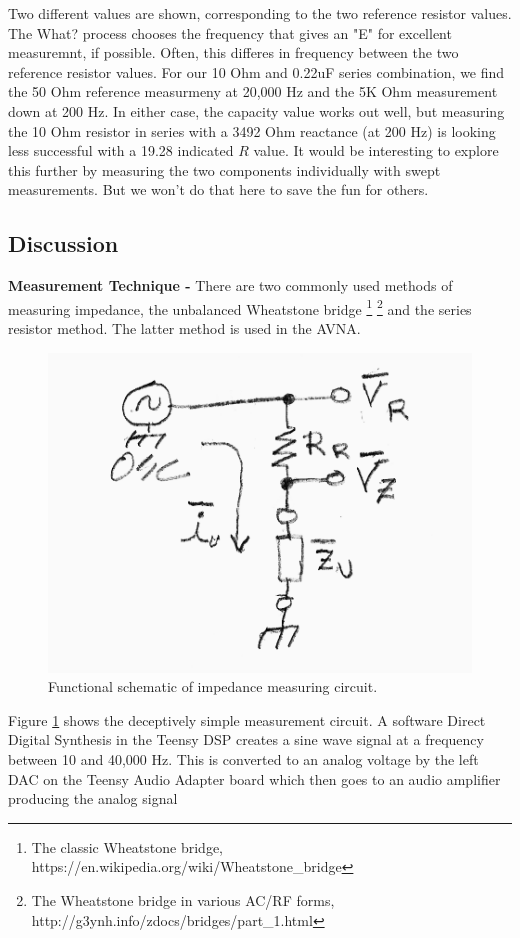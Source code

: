 %
Two different values are shown, corresponding to the two reference resistor values.  The What? process chooses the frequency that gives an "E" for excellent measuremnt, if possible.  Often, this differes in frequency between the two reference resistor values.  For our 10 Ohm and 0.22uF series combination, we find the 50 Ohm reference measurmeny at 20,000 Hz and the 5K Ohm measurement down at 200 Hz.  In either case, the capacity value works out well, but measuring the 10 Ohm resistor in series with a 3492 Ohm reactance (at 200 Hz) is looking less successful with a 19.28 indicated \(R\) value.  It would be interesting to explore this further by measuring the two components individually with swept measurements.  But we won't do that here to save the fun for others.
%
\subsection{Discussion}
%
\textbf{Measurement Technique - } There are two commonly used methods of measuring impedance, the unbalanced Wheatstone bridge
%
\footnote{The classic Wheatstone bridge, https://en.wikipedia.org/wiki/Wheatstone\_bridge}
\footnote{The Wheatstone bridge in various AC/RF forms, http://g3ynh.info/zdocs/bridges/part\_1.html}
% 
 and the series resistor method.   The latter method is used in the AVNA.
\begin{figure}[H]
\begin{center}
\includegraphics[scale=0.75]{./images/AVNA_900.pdf}
\caption{Functional schematic of impedance measuring circuit.}
\label{AVNA_900-label}
\end{center}
\end{figure}
Figure \ref{AVNA_900-label} shows the deceptively simple measurement circuit.  A software Direct Digital Synthesis in the Teensy DSP creates a sine wave signal at a frequency between 10 and 40,000 Hz.  This is converted to an analog voltage by the left DAC on the Teensy Audio Adapter board which then goes to an audio amplifier producing the analog signal
